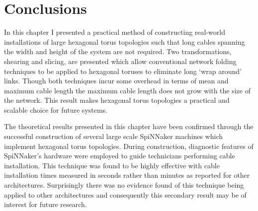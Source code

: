 	\section{Conclusions}
		
		In this chapter I presented a practical method of constructing real-world
		installations of large hexagonal torus topologies such that long cables
		spanning the width and height of the system are not required. Two
		transformations, shearing and slicing, are presented which allow
		conventional network folding techniques to be applied to hexagonal toruses
		to eliminate long `wrap around' links. Though both techniques incur some
		overhead in terms of mean and maximum cable length the maximum cable length
		does not grow with the size of the network. This result makes hexagonal
		torus topologies a practical and scalable choice for future systems.
		
		The theoretical results presented in this chapter have been confirmed
		through the successful construction of several large scale SpiNNaker
		machines which implement hexagonal torus topologies. During construction,
		diagnostic features of SpiNNaker's hardware were employed to guide
		technicians performing cable installation. This technique was found to be
		highly effective with cable installation times measured in seconds rather
		than minutes as reported for other architectures. Surprisingly there was no
		evidence found of this technique being applied to other architectures and
		consequently this secondary result may be of interest for future research.
